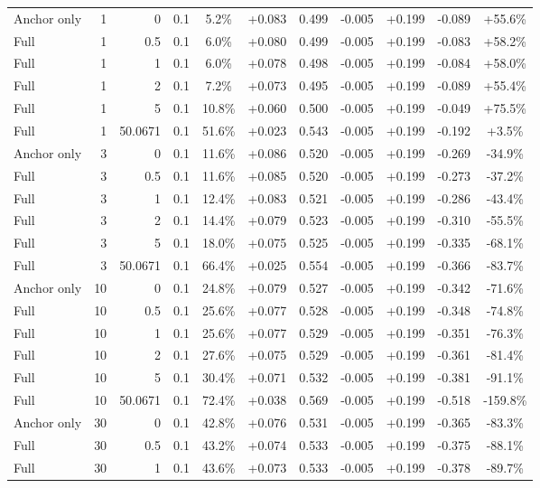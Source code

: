 \begin{table}[htbp]
\begin{tabular}{lrrrccccccc}
Anchor only & 1 & 0 & 0.1 & 5.2\% & +0.083 & 0.499 & -0.005 & +0.199 & -0.089 & +55.6\% \\
Full & 1 & 0.5 & 0.1 & 6.0\% & +0.080 & 0.499 & -0.005 & +0.199 & -0.083 & +58.2\% \\
Full & 1 & 1 & 0.1 & 6.0\% & +0.078 & 0.498 & -0.005 & +0.199 & -0.084 & +58.0\% \\
Full & 1 & 2 & 0.1 & 7.2\% & +0.073 & 0.495 & -0.005 & +0.199 & -0.089 & +55.4\% \\
Full & 1 & 5 & 0.1 & 10.8\% & +0.060 & 0.500 & -0.005 & +0.199 & -0.049 & +75.5\% \\
Full & 1 & 50.0671 & 0.1 & 51.6\% & +0.023 & 0.543 & -0.005 & +0.199 & -0.192 & +3.5\% \\
Anchor only & 3 & 0 & 0.1 & 11.6\% & +0.086 & 0.520 & -0.005 & +0.199 & -0.269 & -34.9\% \\
Full & 3 & 0.5 & 0.1 & 11.6\% & +0.085 & 0.520 & -0.005 & +0.199 & -0.273 & -37.2\% \\
Full & 3 & 1 & 0.1 & 12.4\% & +0.083 & 0.521 & -0.005 & +0.199 & -0.286 & -43.4\% \\
Full & 3 & 2 & 0.1 & 14.4\% & +0.079 & 0.523 & -0.005 & +0.199 & -0.310 & -55.5\% \\
Full & 3 & 5 & 0.1 & 18.0\% & +0.075 & 0.525 & -0.005 & +0.199 & -0.335 & -68.1\% \\
Full & 3 & 50.0671 & 0.1 & 66.4\% & +0.025 & 0.554 & -0.005 & +0.199 & -0.366 & -83.7\% \\
Anchor only & 10 & 0 & 0.1 & 24.8\% & +0.079 & 0.527 & -0.005 & +0.199 & -0.342 & -71.6\% \\
Full & 10 & 0.5 & 0.1 & 25.6\% & +0.077 & 0.528 & -0.005 & +0.199 & -0.348 & -74.8\% \\
Full & 10 & 1 & 0.1 & 25.6\% & +0.077 & 0.529 & -0.005 & +0.199 & -0.351 & -76.3\% \\
Full & 10 & 2 & 0.1 & 27.6\% & +0.075 & 0.529 & -0.005 & +0.199 & -0.361 & -81.4\% \\
Full & 10 & 5 & 0.1 & 30.4\% & +0.071 & 0.532 & -0.005 & +0.199 & -0.381 & -91.1\% \\
Full & 10 & 50.0671 & 0.1 & 72.4\% & +0.038 & 0.569 & -0.005 & +0.199 & -0.518 & -159.8\% \\
Anchor only & 30 & 0 & 0.1 & 42.8\% & +0.076 & 0.531 & -0.005 & +0.199 & -0.365 & -83.3\% \\
Full & 30 & 0.5 & 0.1 & 43.2\% & +0.074 & 0.533 & -0.005 & +0.199 & -0.375 & -88.1\% \\
Full & 30 & 1 & 0.1 & 43.6\% & +0.073 & 0.533 & -0.005 & +0.199 & -0.378 & -89.7\% \\

\end{tabular}
\end{table}
